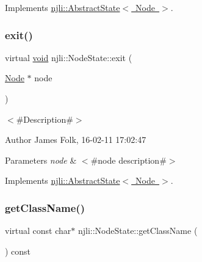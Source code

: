 Implements \mbox{\hyperlink{classnjli_1_1_abstract_state_ae10e437370dcfc3261ec0b9f350f16d8}{njli\+::\+Abstract\+State$<$ Node $>$}}.

\mbox{\label{classnjli_1_1_node_state_adbc43108aab891099b2cd9080f97a543}} 
\subsubsection{\texorpdfstring{exit()}{exit()}}
{\footnotesize\ttfamily virtual \mbox{\hyperlink{_thread_8h_af1e856da2e658414cb2456cb6f7ebc66}{void}} njli\+::\+Node\+State\+::exit (\begin{DoxyParamCaption}\item[{\mbox{\hyperlink{classnjli_1_1_node}{Node}} $\ast$}]{node }\end{DoxyParamCaption})\hspace{0.3cm}{\ttfamily [virtual]}}



$<$\#\+Description\#$>$ 

\begin{DoxyAuthor}{Author}
James Folk, 16-\/02-\/11 17\+:02\+:47
\end{DoxyAuthor}

\begin{DoxyParams}{Parameters}
{\em node} & $<$\#node description\#$>$ \\
\hline
\end{DoxyParams}


Implements \mbox{\hyperlink{classnjli_1_1_abstract_state_a75207a4c62f813d8d84168024a30c60a}{njli\+::\+Abstract\+State$<$ Node $>$}}.

\mbox{\label{classnjli_1_1_node_state_aac4612e5bc3e6a5c4a361e593157723c}} 
\subsubsection{\texorpdfstring{get\+Class\+Name()}{getClassName()}}
{\footnotesize\ttfamily virtual const char$\ast$ njli\+::\+Node\+State\+::get\+Class\+Name (\begin{DoxyParamCaption}{ }\end{DoxyParamCaption}) const\hspace{0.3cm}{\ttfamily [virtual]}}

